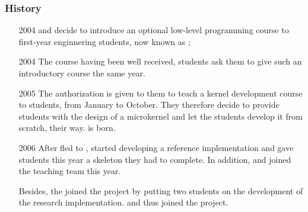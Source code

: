 \begin{frame}
  \frametitle{History}

  \begin{itemize}
    \item[2004]
       and  decide
      to introduce an optional low-level programming course to first-year
      enginnering students, now known as ;
    \item[2004]
      The course having been well received,  students ask them to give such an introductory course the
      same year.
    \item[2005]
      The authorization is given to them to teach a kernel development course
      to  students, from January to October. They therefore decide
      to provide students with the design of a microkernel and let the students
      develop it from scratch, their way.  is born.
    \item[2006]
      After  fled to ,  started developing a reference implementation and gave
      students this year a skeleton they had to complete. In addition,
       and  joined the teaching
      team this year.

      \-

      Besides, the  joined the project
      by putting two students on the development of the 
      research implementation.  and  thus joined the project.
  \end{itemize}
\end{frame}



